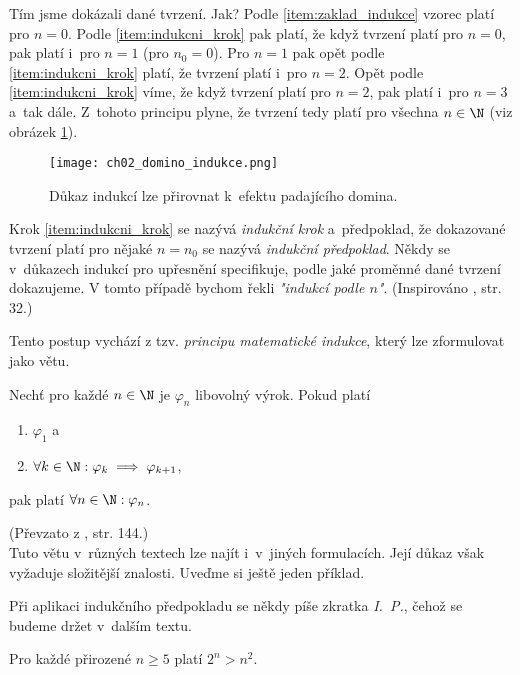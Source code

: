 Tím jsme dokázali dané tvrzení. Jak? Podle \ref{item:zaklad_indukce} vzorec platí pro $n=0$. Podle \ref{item:indukcni_krok} pak platí, že když tvrzení platí pro $n=0$, pak platí i~pro $n=1$ (pro $n_0=0$). Pro $n=1$ pak opět podle \ref{item:indukcni_krok} platí, že tvrzení platí i~pro $n=2$. Opět podle \ref{item:indukcni_krok} víme, že když tvrzení platí pro $n=2$, pak platí i~pro $n=3$ a~tak dále. Z~tohoto principu plyne, že tvrzení tedy platí pro všechna $n\in\N$ (viz obrázek \ref{fig:domino}).
\begin{figure}[H]
    \centering
    \texttt{[image: ch02\_domino\_indukce.png]}
    \caption{Důkaz indukcí lze přirovnat k~efektu padajícího domina.}
    \label{fig:domino}
\end{figure}
Krok \ref{item:indukcni_krok} se nazývá \emph{indukční krok} a~předpoklad, že dokazované tvrzení platí pro nějaké $n=n_0$ se nazývá \emph{indukční předpoklad}. Někdy se v~důkazech indukcí pro upřesnění specifikuje, podle jaké proměnné dané tvrzení dokazujeme. V tomto případě bychom řekli \emph{"indukcí podle $n$"}. (Inspirováno \cite{MatousekNesetril2009}, str. 32.)\par
Tento postup vychází z tzv. \emph{principu matematické indukce}, který lze zformulovat jako větu.
\begin{theorem}
    Nechť pro každé $n\in\N$ je $\varphi_n$ libovolný výrok. Pokud platí
    \begin{enumerate}[label=(\roman*)]
        \item $\varphi_1$ a
        \item $\forall k\in\N: \varphi_k \implies \varphi_{k+1}$,
    \end{enumerate}
    pak platí $\forall n\in\N: \varphi_n$.
\end{theorem}
(Převzato z \cite{ChartrandPolimeniZhang2014}, str. 144.)\\
Tuto větu v~různých textech lze najít i~v~jiných formulacích. Její důkaz však vyžaduje složitější znalosti. Uveďme si ještě jeden příklad.
\begin{convention}
    Při aplikaci indukčního předpokladu se někdy píše zkratka \emph{I.~P.}, čehož se budeme držet v~dalším textu.
\end{convention}
\begin{proposition}
    Pro každé přirozené $n\geq 5$ platí $2^n>n^2$.
\end{proposition}
